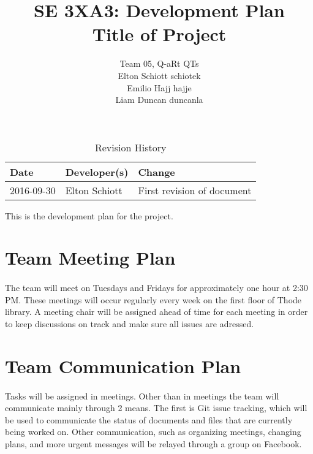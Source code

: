 \documentclass{article}
\title{SE 3XA3: Development Plan\\Title of Project}
\author{Team 05, Q-aRt QTs
		\\ Elton Schiott schiotek
		\\ Emilio Hajj hajje
		\\ Liam Duncan duncanla
}
\date{}
\begin{document}
\begin{table}[hp]
\caption{Revision History} \label{TblRevisionHistory}
\begin{tabularx}{\textwidth}{llX}
\toprule
\textbf{Date} & \textbf{Developer(s)} & \textbf{Change}\\
\midrule
2016-09-30 & Elton Schiott & First revision of document\\

\bottomrule
\end{tabularx}
\end{table}

\newpage

\maketitle

This is the development plan for the project.

\section{Team Meeting Plan}
	
	\paragraph{}
		
		The team will meet on Tuesdays and Fridays for approximately one hour 
		at 2:30 PM. These meetings will occur regularly every week on the first 
		floor of Thode library. A meeting chair will be assigned ahead of time 
		for each meeting in order to keep discussions on track and make sure 
		all issues are adressed.

\section{Team Communication Plan}
	
	\paragraph{}
	
		Tasks will be assigned in meetings. Other than in meetings the team 
		will communicate mainly through 2 means. The first is Git issue 
		tracking, which will be used to communicate the status of documents and 
		files that are currently being worked on. Other communication, such as 
		organizing meetings, changing plans, and more urgent messages will be 
		relayed through a group on Facebook.
\end{document}
